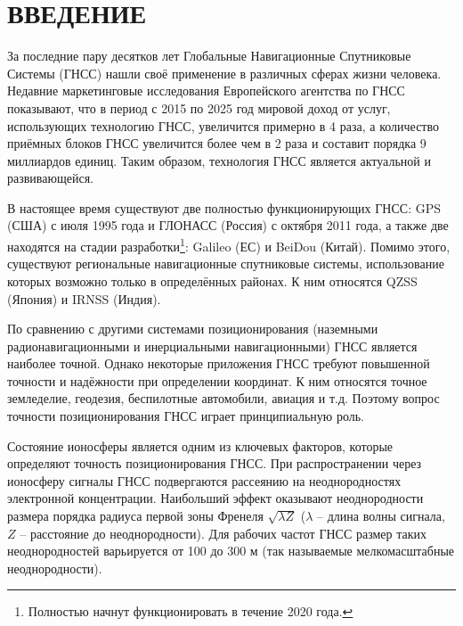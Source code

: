 \chapter*{ВВЕДЕНИЕ}

За последние пару десятков лет Глобальные Навигационные Спутниковые Системы (ГНСС) нашли своё применение в различных сферах жизни человека.
Недавние маркетинговые исследования Европейского агентства по ГНСС \cite{EGA2017} показывают, что в период с 2015 по 2025 год мировой доход от услуг, использующих технологию ГНСС, увеличится примерно в 4 раза, а количество приёмных блоков ГНСС увеличится более чем в 2 раза и составит порядка 9 миллиардов единиц. 
Таким образом, технология ГНСС является актуальной и развивающейся.

В настоящее время существуют две полностью функционирующих ГНСС: GPS (США) с июля 1995 года и ГЛОНАСС (Россия) с октября 2011 года, а также две находятся на стадии разработки\footnote{Полностью начнут функционировать в течение 2020 года.}: Galileo (ЕС) и BeiDou (Китай).
Помимо этого, существуют региональные навигационные спутниковые системы, использование которых возможно только в определённых районах.
К ним относятся QZSS (Япония) и IRNSS (Индия).

По сравнению с другими системами позиционирования (наземными радионавигационными и инерциальными навигационными) ГНСС является наиболее точной.
Однако некоторые приложения ГНСС требуют повышенной точности и надёжности при определении координат.
К ним относятся точное земледелие, геодезия, беспилотные автомобили, авиация и т.д.  
Поэтому вопрос точности позиционирования ГНСС играет принципиальную роль.

Состояние ионосферы является одним из ключевых факторов, которые определяют точность позиционирования ГНСС. 
При распространении через ионосферу сигналы ГНСС подвергаются рассеянию на неоднородностях электронной концентрации. 
Наибольший эффект оказывают неоднородности размера порядка радиуса первой зоны Френеля $\sqrt{\lambda Z}$ ($\lambda$ -- длина волны сигнала, $Z$ -- расстояние до неоднородности). 
Для рабочих частот ГНСС размер таких неоднородностей варьируется от 100 до 300 м (так называемые мелкомасштабные неоднородности). 

